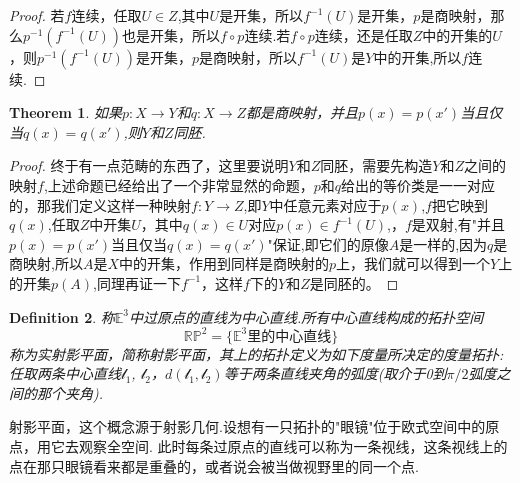 \documentclass{article}
\newtheorem{theorem}{Theorem}[section]
\newtheorem{definition}[theorem]{Definition}
\newcommand*{\xfunc}[4]{{#2}\colon{#3}{#1}{#4}}
\newcommand*{\func}[3]{\xfunc{\to}{#1}{#2}{#3}}
\begin{document}
\begin{proof}
若$f$连续，任取$U \in Z$,其中$U$是开集，所以$f^{-1}(U)$是开集，$p$是商映射，那么$p^{-1}(f^{-1}(U))$也是开集，所以$f \circ p$连续.若$f \circ p$连续，还是任取$Z$中的开集的$U$，则$p^{-1}(f^{-1}(U))$是开集，$p$是商映射，所以$f^{-1}(U)$是$Y$中的开集,所以$f$连续.
\end{proof}

\begin{theorem}
如果$\func{p}{X}{Y}$和$\func{q}{X}{Z}$都是商映射，并且$p(x)=p(x')$当且仅当$q(x)=q(x')$,则$Y$和$Z$同胚.
\begin{center}
\end{center}
\end{theorem}

\begin{proof}
终于有一点范畴的东西了，这里要说明$Y$和$Z$同胚，需要先构造$Y$和$Z$之间的映射$f$,上述命题已经给出了一个非常显然的命题，$p$和$q$给出的等价类是一一对应的，那我们定义这样一种映射$\func{f}{Y}{Z}$,即$Y$中任意元素对应于$p(x)$,$f$把它映到$q(x)$,任取$Z$中开集$U$，其中$q(x) \in U$对应$p(x) \in f^{-1}(U)$,，$f$是双射,有"并且$p(x)=p(x')$当且仅当$q(x)=q(x')$"保证,即它们的原像$A$是一样的,因为$q$是商映射,所以$A$是$X$中的开集，作用到同样是商映射的$p$上，我们就可以得到一个$Y$上的开集$p(A)$,同理再证一下$f^{-1}$，这样$f$下的$Y$和$Z$是同胚的。
\end{proof}

\begin{definition}
称$\mathbb{E}^3$中过原点的直线为中心直线.所有中心直线构成的拓扑空间\[\mathbb{R}\mathbb{P}^2=\{\mathbb{E}^3\text{里的中心直线}\}\]称为实射影平面，简称射影平面，其上的拓扑定义为如下度量所决定的度量拓扑: 任取两条中心直线$\mathcal{l}_1$, $\mathcal{l}_2$，$d(\mathcal{l}_1,\mathcal{l}_2)$等于两条直线夹角的弧度(取介于0到$\pi / 2$弧度之间的那个夹角).
\end{definition}

射影平面，这个概念源于射影几何.设想有一只拓扑的"眼镜"位于欧式空间中的原点，用它去观察全空间. 此时每条过原点的直线可以称为一条视线，这条视线上的点在那只眼镜看来都是重叠的，或者说会被当做视野里的同一个点.
\end{document}
